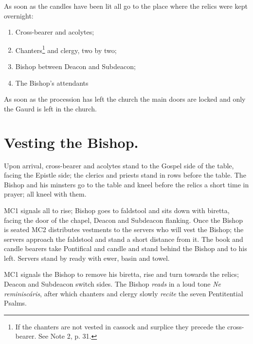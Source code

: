 \documentclass[letterpaper]{report}
\begin{document}
{    \rubric As soon as the candles have been lit all go to the place where the
    relics were kept overnight:

    \begin{enumerate}

        \item Cross-bearer and acolytes;

        \item Chanters\footnote{If the chanters are not vested in cassock and
            surplice they precede the cross-bearer. See \cite{consecranda} Note
            2, p. 31.} and clergy, two by two;

        \item Bishop between Deacon and Subdeacon;

        \item The Bishop's attendants

    \end{enumerate}

    As soon as the procession has left the church the main doors are locked and
    only the Gaurd is left in the church.

    \section{Vesting the Bishop.}

    \rubric Upon arrival, cross-bearer and acolytes stand to the Gospel side of
    the table, facing the Epistle side; the clerics and priests stand in rows
    before the table. The Bishop and his minsters
    go to the table and kneel before the relics a short time in prayer; all
    kneel with them.

    \rubric MC1 signals all to rise; Bishop goes to faldstool and sits down
    with biretta, facing the door of the chapel, Deacon and Subdeacon flanking.
    Once the Bishop is seated MC2 distributes vestments to the servers who will
    vest the Bishop; the servers approach the faldstool and stand a short
    distance from it. The book and candle bearers take Pontifical and candle
    and stand behind the Bishop and to his left. Servers stand by ready with
    ewer, basin and towel.

    \rubric MC1 signals the Bishop to remove his biretta, rise and turn towards
    the relics; Deacon and Subdeacon switch sides. The Bishop \textit{reads} in
    a loud tone \textit{Ne reminisc\'aris}, after which chanters and clergy
    slowly \textit{recite} the seven Pentitential Psalms.

}
\end{document}
